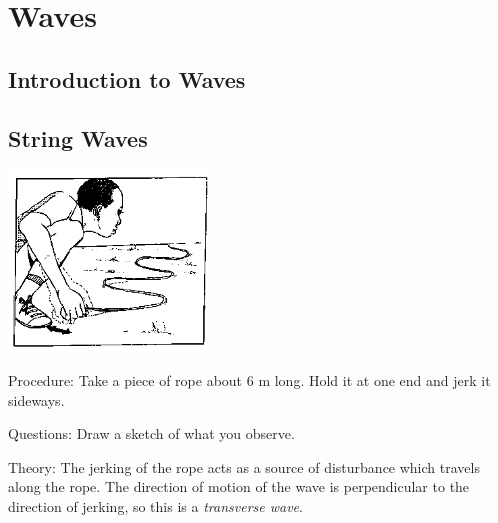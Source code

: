 \section{Waves} 

\begin{multicols}{2}


\section*{Introduction to Waves} 


\subsection{String Waves}

\begin{center}
\includegraphics[width=0.4\textwidth]{./img/source/string-waves.png}
\end{center}

\begin{description*}
\item[Procedure:]{Take a piece of rope about 6 m long. Hold it at one end and jerk it sideways.}
\item[Questions:]{Draw a sketch of what you observe.}
\item[Theory:]{The jerking of the rope acts as a source of disturbance which travels along the rope. The direction of motion of the wave is perpendicular to the direction of jerking, so this is a \emph{transverse wave}.}
\end{description*}


\end{multicols}
